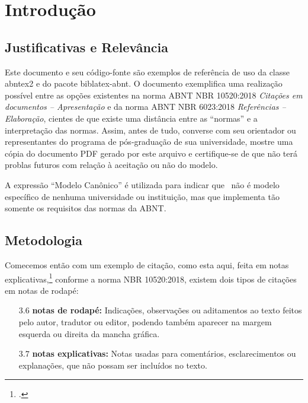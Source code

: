 \chapter[Introdução]{Introdução}

\section{Justificativas e Relev{\^a}ncia}
%
Este documento e seu código-fonte são exemplos de referência de uso da classe
\textsf{abntex2} e do pacote \textsf{biblatex-abnt}. O documento exemplifica uma realização possível entre as opções existentes na norma ABNT NBR 10520:2018 \emph{Citações em documentos -- Apresentação} e da norma ABNT NBR 6023:2018 \emph{Referências -- Elaboração}, cientes de que existe uma distância entre as ``normas'' e a interpretação das normas. Assim, antes de tudo, converse com seu orientador ou representantes do programa de pós-graduação de sua universidade, mostre uma cópia do documento PDF gerado por este arquivo e certifique-se de que não terá problas futuros com relação à aceitação ou não do modelo.

A expressão ``Modelo Canônico'' é utilizada para indicar que \abnTeX\ não é modelo específico de nenhuma universidade ou instituição, mas que implementa tão somente os requisitos das normas da ABNT. 

\section{Metodologia}
Comecemos então com um exemplo de citação, como esta aqui, feita em notas explicativas,\footcite{boyle1772} conforme a norma NBR 10520:2018, existem dois tipos de citações em notas de rodapé:
\begin{citacao}
	\begin{itemize}
		\item[$3.6$] \textbf{notas de rodapé:} Indicações, observações ou aditamentos ao texto feitos pelo autor, tradutor ou editor, podendo	também aparecer na margem esquerda ou direita da mancha gráfica. 
		\item[$3.7$] \textbf{notas explicativas:} Notas usadas para comentários, esclarecimentos ou explanações, que não possam ser incluídos no texto.
	\end{itemize} 
\end{citacao}


